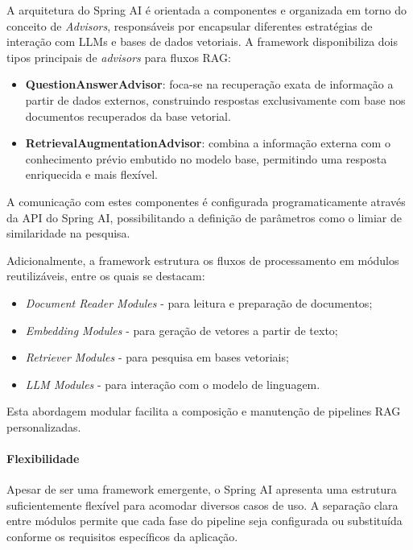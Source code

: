 A arquitetura do Spring AI é orientada a componentes e organizada em torno do conceito de \emph{Advisors}, responsáveis por encapsular diferentes estratégias de interação com LLMs e bases de dados vetoriais. A framework disponibiliza dois tipos principais de \textit{advisors} para fluxos RAG:

\begin{itemize} 
        \item \textbf{QuestionAnswerAdvisor}: foca-se na recuperação exata de informação a partir de dados externos, construindo respostas exclusivamente com base nos documentos recuperados da base vetorial. 
        \item \textbf{RetrievalAugmentationAdvisor}: combina a informação externa com o conhecimento prévio embutido no modelo base, permitindo uma resposta enriquecida e mais flexível. 
\end{itemize}

A comunicação com estes componentes é configurada programaticamente através da API do Spring AI, possibilitando a definição de parâmetros como o limiar de similaridade na pesquisa.

Adicionalmente, a framework estrutura os fluxos de processamento em módulos reutilizáveis, entre os quais se destacam: 
\begin{itemize} 
        \item \emph{Document Reader Modules} - para leitura e preparação de documentos; 
        \item \emph{Embedding Modules} - para geração de vetores a partir de texto; \item \emph{Retriever Modules} - para pesquisa em bases vetoriais; 
        \item \emph{LLM Modules} - para interação com o modelo de linguagem. 
\end{itemize}

Esta abordagem modular facilita a composição e manutenção de pipelines RAG personalizadas.

\paragraph{Flexibilidade}

Apesar de ser uma framework emergente, o Spring AI apresenta uma estrutura suficientemente flexível para acomodar diversos casos de uso. A separação clara entre módulos permite que cada fase do pipeline seja configurada ou substituída conforme os requisitos específicos da aplicação.

